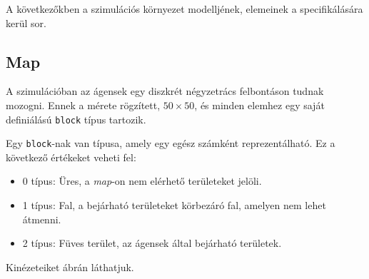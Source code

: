 A következőkben a szimulációs környezet modelljének, elemeinek a specifikálására kerül sor.

\subsection{Map}

A szimulációban az ágensek egy diszkrét négyzetrács felbontáson tudnak mozogni. Ennek a mérete rögzített, $50 \times 50$, és minden elemhez egy saját definiálású \texttt{block} típus tartozik.

Egy \texttt{block}-nak van típusa, amely egy egész számként reprezentálható. Ez a következő értékeket veheti fel:
\begin{itemize}
\item 0 típus: Üres, a \textit{map}-on nem elérhető területeket jelöli.
\item 1 típus: Fal, a bejárható területeket körbezáró fal, amelyen nem lehet átmenni.
\item 2 típus: Füves terület, az ágensek által bejárható területek.
\end{itemize}

Kinézeteiket  ábrán láthatjuk. 

